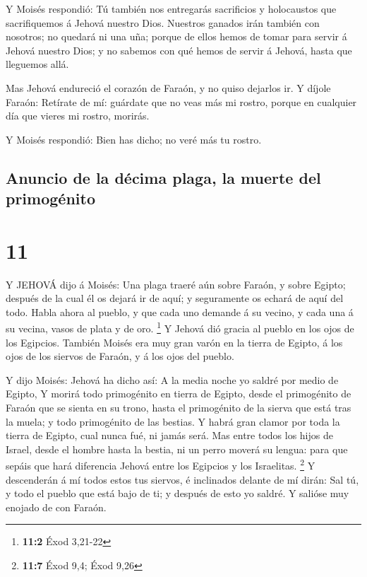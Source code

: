  Y Moisés respondió: Tú también nos entregarás sacrificios
y holocaustos que sacrifiquemos á Jehová nuestro Dios. 
Nuestros ganados irán también con nosotros; no quedará ni una uña;
porque de ellos hemos de tomar para servir á Jehová nuestro Dios; y no
sabemos con qué hemos de servir á Jehová, hasta que lleguemos allá.

 Mas Jehová endureció el corazón de Faraón, y no quiso
dejarlos ir.  Y díjole Faraón: Retírate de mí: guárdate que
no veas más mi rostro, porque en cualquier día que vieres mi rostro,
morirás.

 Y Moisés respondió: Bien has dicho; no veré más tu rostro.

\hypertarget{anuncio-de-la-duxe9cima-plaga-la-muerte-del-primoguxe9nito}{%
\subsection{Anuncio de la décima plaga, la muerte del
primogénito}\label{anuncio-de-la-duxe9cima-plaga-la-muerte-del-primoguxe9nito}}

\hypertarget{section-10}{%
\section{11}\label{section-10}}

 Y JEHOVÁ dijo á Moisés: Una plaga traeré aún sobre Faraón,
y sobre Egipto; después de la cual él os dejará ir de aquí; y
seguramente os echará de aquí del todo.  Habla ahora al
pueblo, y que cada uno demande á su vecino, y cada una á su vecina,
vasos de plata y de oro. \footnote{\textbf{11:2} Éxod 3,21-22}
 Y Jehová dió gracia al pueblo en los ojos de los Egipcios.
También Moisés era muy gran varón en la tierra de Egipto, á los ojos de
los siervos de Faraón, y á los ojos del pueblo.

 Y dijo Moisés: Jehová ha dicho así: A la media noche yo
saldré por medio de Egipto,  Y morirá todo primogénito en
tierra de Egipto, desde el primogénito de Faraón que se sienta en su
trono, hasta el primogénito de la sierva que está tras la muela; y todo
primogénito de las bestias.  Y habrá gran clamor por toda la
tierra de Egipto, cual nunca fué, ni jamás será.  Mas entre
todos los hijos de Israel, desde el hombre hasta la bestia, ni un perro
moverá su lengua: para que sepáis que hará diferencia Jehová entre los
Egipcios y los Israelitas. \footnote{\textbf{11:7} Éxod 9,4; Éxod 9,26}
 Y descenderán á mí todos estos tus siervos, é inclinados
delante de mí dirán: Sal tú, y todo el pueblo que está bajo de ti; y
después de esto yo saldré. Y salióse muy enojado de con Faraón.

